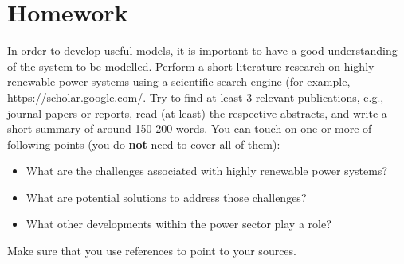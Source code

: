 \section{Homework}
In order to develop useful models, it is important to have a good understanding of the system to be modelled. Perform a short literature research on highly renewable power systems using a scientific search engine (for example, \href{https://scholar.google.com/}{https://scholar.google.com/}. Try to find at least 3 relevant publications, e.g., journal papers or reports, read (at least) the respective abstracts, and write a short summary of around 150-200 words. You can touch on one or more of following points (you do \textbf{not} need to cover all of them):
\begin{itemize}
\item What are the challenges associated with highly renewable power systems?
\item What are potential solutions to address those challenges?
\item What other developments within the power sector play a role?
\end{itemize}

Make sure that you use references to point to your sources. 

